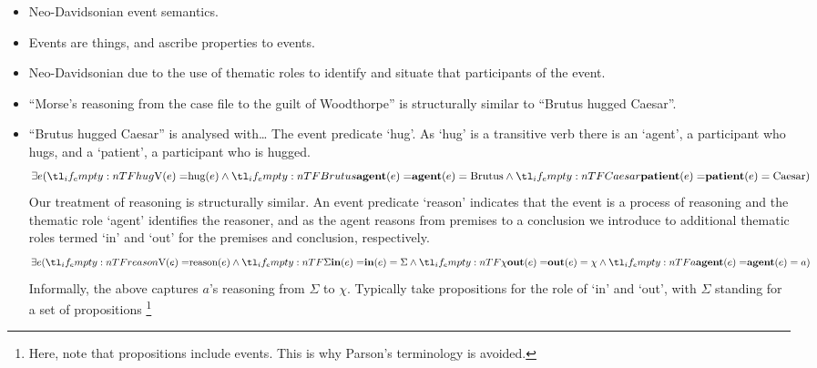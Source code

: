 \documentclass[10pt]{article}
\begin{document}
\begin{itemize}
\item Neo-Davidsonian event semantics.
\item Events are things, and ascribe properties to events.
\item Neo-Davidsonian due to the use of thematic roles to identify and situate that participants of the event.
\end{itemize}



\begin{itemize}
\item ``Morse's reasoning from the case file to the guilt of Woodthorpe'' is structurally similar to ``Brutus hugged Caesar''.
\item ``Brutus hugged Caesar'' is analysed with\dots
  The event predicate `hug'.
  As `hug' is a transitive verb there is an `agent', a participant who hugs, and a `patient', a participant who is hugged.
  \[
    \exists e(\everb{hug} \land \eagent{Brutus} \land \epatient{Caesar})
  \]
  Our treatment of reasoning is structurally similar.
  An event predicate `reason' indicates that the event is a process of reasoning and the thematic role `agent' identifies the reasoner, and as the agent reasons from premises to a conclusion we introduce to additional thematic roles termed `in' and `out' for the premises and conclusion, respectively.
  \[
    \exists e(\everb{reason} \land \ein{\Sigma} \land \eout{\chi} \land \eagentm{a})
  \]
  Informally, the above captures \(a\)'s reasoning from \(\Sigma\) to \(\chi\).
  {\color{red} Typically} take propositions for the role of `in' and `out', with \(\Sigma\) standing for a set of propositions\nolinebreak
  \footnote{Here, note that propositions include events.
    This is why Parson's terminology is avoided.

}
\end{itemize}
\end{document}
